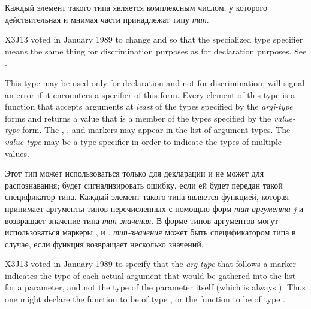 \begin{flushdesc}
\item[\cd{(copmlex \textit{тип})}]
Каждый элемент такого типа является комплексным числом, у которого
действительная и мнимая части принадлежат типу \textit{тип}.

\begin{new}
X3J13 voted in January 1989
to change  and 
so that the specialized 
type specifier means the same thing for discrimination purposes
as for declaration purposes.
See .
\end{new}


\item[\cd{(function (\textit{arg1-type} \textit{arg2-type} ...) \textit{value-type})}]
\relax This type may be used only for declaration and not for
discrimination;  will signal an error if it encounters a specifier of
this form. Every element of this type is
a function that accepts arguments at \textit{least} of the
types specified by the \textit{argj-type} forms and returns a value that is a
member of the types specified by the \textit{value-type} form.  The
, , and  markers
may appear in the list of argument types.
The \textit{value-type} may be a  type specifier
in order to indicate the types of multiple values.

\item[\cd{(function (\textit{тип-аргумента-1} \textit{тип-аргумента-2} ...) \textit{тип-значения})}]
\relax Этот тип может использоваться только для декларации и не может для
распознавания;  будет сигнализировать ошибку, если ей будет передан
такой спецификатор типа. Каждый элемент такого типа является функцией, которая
принимает аргументы типов перечисленных с помощью форм \textit{тип-аргумента-j}
и возвращает значение типа \textit{тип-значения}. В форме типов аргументов могут
использоваться маркеры ,  и
. \textit{тип-значения} может быть спецификатором типа  в
случае, если функция возвращает несколько значений.

\begin{new}
X3J13 voted in January 1989
to specify that the \textit{arg-type} that
follows a  marker indicates the type of each actual argument
that would be gathered into the list for a  parameter,
and not the type of the  parameter itself (which is always
).  Thus one might declare the function  to
be of type , or
the function  to be of type
.
\end{new}


\end{flushdesc}
